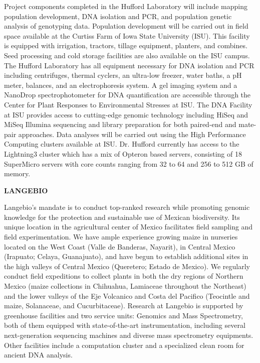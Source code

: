 Project components completed in the Hufford Laboratory will include mapping population development, DNA isolation and PCR, and population genetic analysis of genotyping data. Population development will be carried out in field space available at the Curtiss Farm of Iowa State University (ISU).  This facility is equipped with irrigation, tractors, tillage equipment, planters, and combines.  Seed processing and cold storage facilities are also available on the ISU campus.  The Hufford Laboratory has all equipment necessary for DNA isolation and PCR including centrifuges, thermal cyclers, an ultra-low freezer, water baths, a pH meter, balances, and an electrophoresis system. A gel imaging system and a NanoDrop spectrophotometer for DNA quantification are accessible through the Center for Plant Responses to Environmental Stresses at ISU. The DNA Facility at ISU provides access to cutting-edge genomic technology including HiSeq and MiSeq Illumina sequencing and library preparation for both paired-end and mate-pair approaches.  Data analyses will be carried out using the High Performance Computing clusters available at ISU. Dr. Hufford currently has access to the Lightning3 cluster which has a mix of Opteron based servers, consisting of 18 SuperMicro servers with core counts ranging from 32 to 64 and 256 to 512 GB of memory.

\textbf{LANGEBIO} %

Langebio’s mandate is to conduct top-ranked research while promoting genomic knowledge for the protection and sustainable use of Mexican biodiversity. Its unique location in the agricultural center of Mexico facilitates field sampling and field experimentation. We have ample experience growing maize in nurseries located on the West Coast (Valle de Banderas, Nayarit), in Central Mexico (Irapuato; Celaya, Guanajuato), and have begun to establish additional sites in the high valleys of Central Mexico (Queretero; Estado de Mexico). We regularly conduct field expeditions to collect plants in both the dry regions of Northern Mexico (maize collections in Chihuahua, Lamiaceae throughout the Northeast) and the lower valleys of the Eje Volcanico and Costa del Pacifico (Teocintle and maize, Solanaceae, and Cucurbitaceae). Research at Langebio is supported by greenhouse facilities and two service units: Genomics and Mass Spectrometry, both of them equipped with state-of-the-art instrumentation, including several next-generation sequencing machines and diverse mass spectrometry equipments. Other facilities include a computation cluster and a specialized clean room for ancient DNA analysis.
